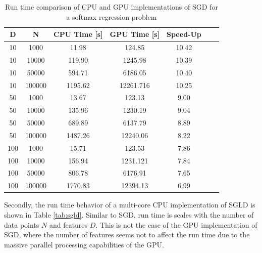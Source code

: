 \documentclass[conference]{IEEEtran}
\begin{document}
\begin{table}[h]
	\centering
 \begin{tabular}{|c|c|c|c|c|c|c|}
 	\hline 
 	D & N & CPU Time [s] & GPU Time [s]  & Speed-Up\\ 
 	\hline 
 	10 &	1000&	11.98&	124.85& 10.42\\
 	10&	10000&	119.90&	1245.98& 10.39\\
 	10&	50000&	594.71&	6186.05& 10.40\\
 	10&	100000&	1195.62&	12261.716& 10.25\\
 	\hline
 	50&	1000&	13.67&	123.13& 9.00\\
 	50&	10000&	135.96&	1230.19& 9.04\\
 	50&	50000&	689.89&	6137.79& 8.89\\
 	50&	100000&	1487.26&	12240.06& 8.22\\
 	\hline
 	100&	1000&	15.71&	123.53& 7.86\\
 	100	&10000&	156.94&	1231.121& 7.84\\
 	100&	50000&	806.78&	6176.91& 7.65\\
 	100&	100000&	1770.83&	12394.13& 6.99\\
 	\hline 
 \end{tabular}
\caption{Run time comparison of CPU and GPU implementations of SGD for a softmax regression problem}
\label{tab:sgd} 
\end{table}
 
Secondly, the run time behavior of a multi-core CPU implementation of SGLD is shown in Table \ref{tab:sgld}. Similar to SGD, run time is scales with the number of data points $N$ and features $D$. This is not the case of the GPU implementation of SGD, where the number of features seems not to affect the run time due to the massive parallel processing capabilities of the GPU.
\end{document}
